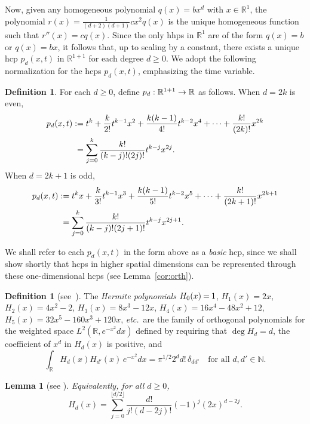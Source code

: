 \documentclass[10pt]{amsart}
\newtheorem{lemm}[theo]{Lemma}\newtheorem{prop}[theo]{Proposition}\newtheorem{coro}[theo]{Corollary}\newtheorem{conj}[theo]{Conjecture}
\theoremstyle{definition}\newtheorem{defi}[theo]{Definition}\newtheorem{rema}[theo]{Remark}\newtheorem{exam}[theo]{Example}\newtheorem{exem}[theo]{Example}\newtheorem{nota}[theo]{Notation}
\newcommand{\N}{\mathbb{N}}
\newcommand{\R}{\mathbb{R}}
\newcommand*{\mk}{\mkern -1mu}
\newcommand*{\Mk}{\mkern -2mu}
\newcommand*{\MK}{\mkern 2mu}
\renewcommand*{\to}{\mathchoice{\longrightarrow}{\rightarrow}{\rightarrow}{\rightarrow}}
\begin{document}
Now, given any homogeneous polynomial $q(x)=bx^d$ with $x\in\R^1$, the polynomial $r(x)=\frac{1}{(d+2)(d+1)}cx^2q(x)$ is the unique homogeneous function such that $r''(x)=cq(x)$. Since the only hhps in $\R^1$ are of the form $q(x)=b$ or $q(x)=bx$, it follows that, up to scaling by a constant, there exists a unique hcp $p_d(x,t)$ in $\R^{1+1}$ for each degree $d\geq 0$. We adopt the following normalization for the hcps $p_d(x,t)$, emphasizing the time variable.

\begin{defi}\label{def:basic-p}
For each $d\geq 0$, define $p_d:\R^{1+1}\to\R$ as follows. When $d=2k$ is even,
\begin{align*}
p_{d}(x,t) \,\MK &\!\Mk:= t^k + \frac{k}{2!} t^{k-1} x^2 + \frac{k(k-1)}{4!} t^{k-2} x^4 + \dots + \frac{k!}{(2k)!} x^{2k} \\
&= \sum_{j=0}^k \frac{k!}{(k-j)! (2j)!} t^{k-j} x^{2j}.
\end{align*}
When $d=2k+1$ is odd,
\begin{align*}
p_{d}(x,t) \,\MK &\!\Mk:= t^k x + \frac{k}{3!} t^{k-1} x^3 + \frac{k(k-1)}{5!} t^{k-2} x^5 + \dots + \frac{k!}{(2k+1)!} x^{2k+1} \\
&= \sum_{j=0}^k \frac{k!}{(k-j)! (2j+1)!} t^{k-j} x^{2j+1}.
\end{align*}
\end{defi}

{We shall refer to each $p_d(x,t)$ in the form above as a \emph{basic} hcp, since we shall show shortly that hcps in higher spatial dimensions can be represented through these one-dimensional hcps (see Lemma~\ref{cor:orth}).}

\begin{defi}[{see~\cite[Section~5.5]{Szego75}}]
\!\! The \emph{Hermite polynomials} ${H_0(x)\mk=\mk 1}$, $H_1(x)=2x$, $H_2(x)=4x^2-2$, $H_3(x)=8x^3-12x$, $H_4(x)=16x^4-48x^2+12$, $H_5(x)=32x^5-160x^3+120x$, \emph{etc.}~are the family of orthogonal polynomials for the weighted space $L^2(\R,e^{-x^2}dx)$ defined by requiring that $\deg H_d=d$, the coefficient of $x^d$ in $H_d(x)$ is positive, and
\begin{equation}\label{H-def}
\int_{\R} H_{d}(x)H_{d'}(x)\,e^{-x^2}dx=\pi^{1/2}2^d d!\,\delta_{dd'}\quad\text{for all }d,d'\in\N.
\end{equation}
\end{defi}

\begin{lemm}[see {\cite[Section~5.5]{Szego75}}]
Equivalently, for all $d\geq 0$,
\begin{equation}\label{H-expansion}
H_d(x)=\sum_{j=0}^{\lfloor d/2\rfloor} \frac{d!}{j!(d-2j)!}(-1)^j(2x)^{d-2j}.
\end{equation}
\end{lemm}
\end{document}
